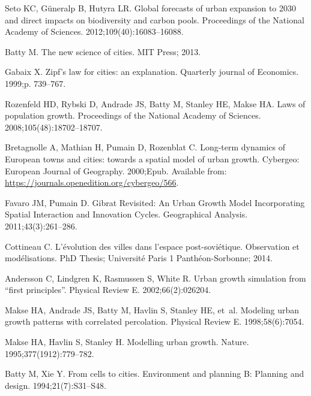 \documentclass[10pt,letterpaper]{article}
\begin{document}
\begin{thebibliography}{10}

Seto KC, G{\"u}neralp B, Hutyra LR.
\newblock Global forecasts of urban expansion to 2030 and direct impacts on
  biodiversity and carbon pools.
\newblock Proceedings of the National Academy of Sciences.
  2012;109(40):16083--16088.

Batty M.
\newblock The new science of cities.
\newblock MIT Press; 2013.

Gabaix X.
\newblock Zipf's law for cities: an explanation.
\newblock Quarterly journal of Economics. 1999;p. 739--767.

Rozenfeld HD, Rybski D, Andrade JS, Batty M, Stanley HE, Makse HA.
\newblock Laws of population growth.
\newblock Proceedings of the National Academy of Sciences.
  2008;105(48):18702--18707.

Bretagnolle A, Mathian H, Pumain D, Rozenblat C.
\newblock Long-term dynamics of European towns and cities: towards a spatial
  model of urban growth.
\newblock Cybergeo: European Journal of Geography. 2000;Epub.
\newblock Available from: \url{https://journals.openedition.org/cybergeo/566}.

Favaro JM, Pumain D.
\newblock Gibrat Revisited: An Urban Growth Model Incorporating Spatial
  Interaction and Innovation Cycles.
\newblock Geographical Analysis. 2011;43(3):261--286.

Cottineau C.
\newblock L'{\'e}volution des villes dans l'espace post-sovi{\'e}tique.
  Observation et mod{\'e}lisations.
\newblock PhD Thesis; Universit{\'e} Paris 1 Panth{\'e}on-Sorbonne; 2014.

Andersson C, Lindgren K, Rasmussen S, White R.
\newblock Urban growth simulation from ``first principles''.
\newblock Physical Review E. 2002;66(2):026204.

Makse HA, Andrade JS, Batty M, Havlin S, Stanley HE, et~al.
\newblock Modeling urban growth patterns with correlated percolation.
\newblock Physical Review E. 1998;58(6):7054.

Makse HA, Havlin S, Stanley H.
\newblock Modelling urban growth.
\newblock Nature. 1995;377(1912):779--782.

Batty M, Xie Y.
\newblock From cells to cities.
\newblock Environment and planning B: Planning and design. 1994;21(7):S31--S48.


\end{thebibliography}
\end{document}
